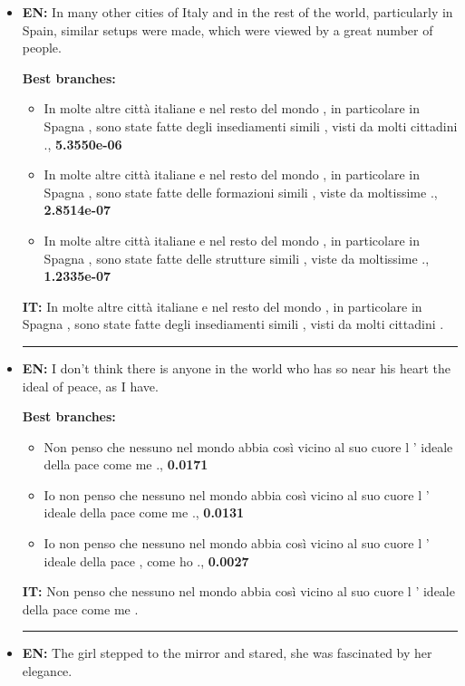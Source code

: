 \begin{itemize}
    \item \textbf{EN:} In many other cities of Italy and in the rest of the world, particularly in Spain, similar setups were made, which were viewed by a great number of people.
    
    \textbf{Best branches:}
    \begin{itemize}
        \item In molte altre città italiane e nel resto del mondo , in particolare in Spagna , sono state fatte degli insediamenti simili , visti da molti cittadini ., \textbf{5.3550e-06}
        \item  In molte altre città italiane e nel resto del mondo , in particolare in Spagna , sono state fatte delle formazioni simili , viste da moltissime ., \textbf{2.8514e-07}
        \item In molte altre città italiane e nel resto del mondo , in particolare in Spagna , sono state fatte delle strutture simili , viste da moltissime ., \textbf{1.2335e-07}
    \end{itemize}
    \textbf{IT:} In molte altre città italiane e nel resto del mondo , in particolare in Spagna , sono state fatte degli insediamenti simili , visti da molti cittadini .\\
    \noindent\rule{14.8cm}{0.4pt}

    \item \textbf{EN:} I don't think there is anyone in the world who has so near his heart the ideal of peace, as I have.
    
    \textbf{Best branches:}
    \begin{itemize}
    \item Non penso che nessuno nel mondo abbia così vicino al suo cuore l ' ideale della pace come me ., \textbf{0.0171}
    \item Io non penso che nessuno nel mondo abbia così vicino al suo cuore l ' ideale della pace come me ., \textbf{0.0131}
    \item Io non penso che nessuno nel mondo abbia così vicino al suo cuore l ' ideale della pace , come ho ., \textbf{0.0027}
    \end{itemize}
    \textbf{IT:} Non penso che nessuno nel mondo abbia così vicino al suo cuore l ' ideale della pace come me .\\
    \noindent\rule{14.8cm}{0.4pt}

    \item \textbf{EN:} The girl stepped to the mirror and stared, she was fascinated by her elegance.
    

\end{itemize}
